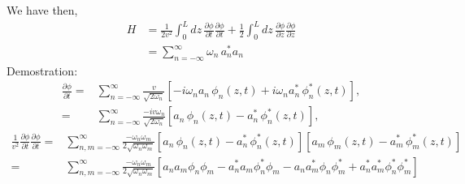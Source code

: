 \begin{frame}
We have then,
\begin{align}
\label{eq:12}
  H&=\frac{1}{2v^2}\int_0^Ldz\,\frac{\partial\phi}{\partial t}\frac{\partial\phi}{\partial t}+
  \frac{1}{2}\int_0^Ldz\,\frac{\partial\phi}{\partial z}\frac{\partial\phi}{\partial z}\nonumber\\
&=\sum_{n=-\infty}^\infty\omega_n\,a_n^*a_n
\end{align}
Demostration:
\begin{align}
  \frac{\partial\phi}{\partial t}=&\sum_{n=-\infty}^\infty \frac{v}{\sqrt{2\omega_n}}
  \left[-i\omega_n a_n\,\phi_n(z,t)+i\omega_n a_n^*\,\phi_n^*(z,t)\right],\nonumber\\
=&\sum_{n=-\infty}^\infty\frac{-i v\omega_n}{\sqrt{2\omega_n}}
  \left[a_n\,\phi_n(z,t)- a_n^*\,\phi_n^*(z,t)\right],
\end{align}
\begin{align}
\frac{1}{v^2}   \frac{\partial\phi}{\partial t} \frac{\partial\phi}{\partial t}=&
\sum_{n,m=-\infty}^\infty\frac{- \omega_n\omega_m}{2\sqrt{\omega_n\omega_m}}
  \left[a_n\,\phi_n(z,t)- a_n^*\,\phi_n^*(z,t)\right]
\left[a_m\,\phi_m(z,t)- a_m^*\,\phi_m^*(z,t)\right]\\
=  &
\sum_{n,m=-\infty}^\infty\frac{- \omega_n\omega_m}{2\sqrt{\omega_n\omega_m}}
  \left[a_n a_m \phi_n \phi_m- a_n^*a_m\phi_n^*\phi_m-a_n a_m^* \phi_n \phi_m^*+ a_n^*a_m^*\phi_n^*\phi_m^*\right]
\end{align}


\end{frame}
